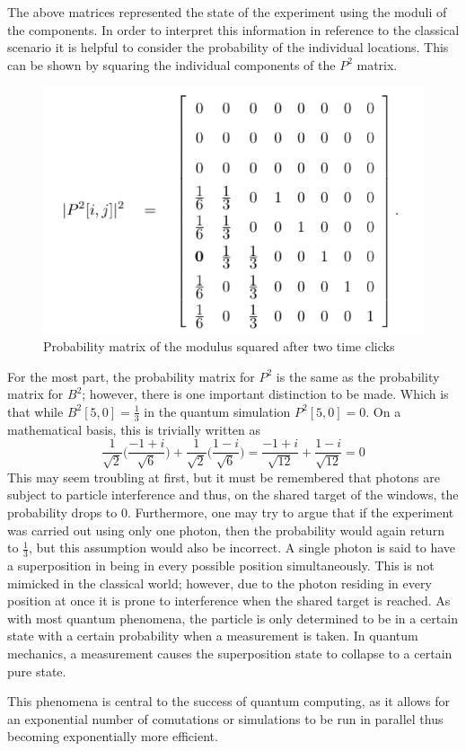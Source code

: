 \documentclass[12pt]{article}
\begin{document}
The above matrices represented the state of the experiment using the moduli of the components. In order to interpret this information in reference to the classical scenario it is helpful to consider the probability of the individual locations. This can be shown by squaring the individual components of the $P^2$ matrix.
\begin{figure}
	\centering
	\caption{Probability matrix of the modulus squared after two time clicks}
	\includegraphics[width=.5\textwidth]{quantumProbability}
\end{figure}
\par
For the most part, the probability matrix for $P^2$ is the same as the probability matrix for $B^2$; however, there is one important distinction to be made. Which is that while $B^2[5,0] = \frac{1}{3}$ in the quantum simulation $P^2[5,0] = 0$. On a mathematical basis, this is trivially written as 
$$\frac{1}{\sqrt{2}}\bigg(\frac{-1+i}{\sqrt{6}}\bigg) + \frac{1}{\sqrt{2}}\bigg(\frac{1-i}{\sqrt{6}}\bigg) = \frac{-1+i}{\sqrt{12}} + \frac{1-i}{\sqrt{12}} = 0$$
This may seem troubling at first, but it must be remembered that photons are subject to particle interference and thus, on the shared target of the windows, the probability drops to 0. Furthermore, one may try to argue that if the experiment was carried out using only one photon, then the probability would again return to $\frac{1}{3}$, but this assumption would also be incorrect. A single photon is said to have a superposition in being in every possible position simultaneously. This is not mimicked in the classical world; however, due to the photon residing in every position at once it is prone to interference when the shared target is reached. As with most quantum phenomena, the particle is only determined to be in a certain state with a certain probability when a measurement is taken. In quantum mechanics, a measurement causes the superposition state to collapse to a certain pure state.\cite{intro}\par
This phenomena is central to the success of quantum computing, as it allows for an exponential number of comutations or simulations to be run in parallel thus becoming exponentially more efficient.
\end{document}
